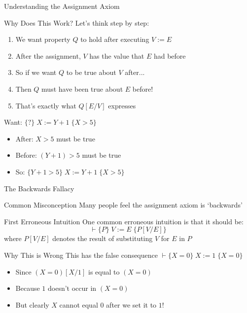 \begin{frame}{Understanding the Assignment Axiom}
    \begin{block}{Why Does This Work?}
        Let's think step by step:
        \begin{enumerate}
            \item We want property $Q$ to hold after executing $V := E$
            \item After the assignment, $V$ has the value that $E$ had before
            \item So if we want $Q$ to be true about $V$ after...
            \item Then $Q$ must have been true about $E$ before!
            \item That's exactly what $Q[E/V]$ expresses
        \end{enumerate}
    \end{block}
    
    \begin{example}
        Want: $\{?\} \; X := Y + 1 \; \{X > 5\}$
        \begin{itemize}
            \item After: $X > 5$ must be true
            \item Before: $(Y + 1) > 5$ must be true
            \item So: $\{Y + 1 > 5\} \; X := Y + 1 \; \{X > 5\}$
        \end{itemize}
    \end{example}
\end{frame}

\begin{frame}{The Backwards Fallacy}
    \begin{block}{Common Misconception}
        Many people feel the assignment axiom is `backwards'
    \end{block}
    
    \begin{block}{First Erroneous Intuition}
        One common erroneous intuition is that it should be:
        \[ \vdash \{P\} \; V := E \; \{P[V/E]\} \]
        where $P[V/E]$ denotes the result of substituting $V$ for $E$ in $P$
    \end{block}
    
    \begin{alertblock}{Why This is Wrong}
        This has the false consequence $\vdash \{X = 0\} \; X := 1 \; \{X = 0\}$
        \begin{itemize}
            \item Since $(X = 0)[X/1]$ is equal to $(X = 0)$ 
            \item Because $1$ doesn't occur in $(X = 0)$
            \item But clearly $X$ cannot equal $0$ after we set it to $1$!
        \end{itemize}
    \end{alertblock}
\end{frame}

